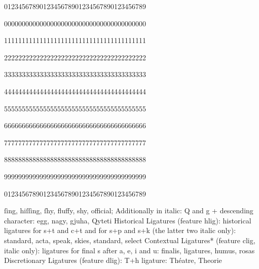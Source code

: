 
\null\par{\mktsTightParagraphs{}\null\par
0123456789012345678901234567890123456789\par
0000000000000000000000000000000000000000\par
1111111111111111111111111111111111111111\par
2222222222222222222222222222222222222222\par
3333333333333333333333333333333333333333\par
4444444444444444444444444444444444444444\par
5555555555555555555555555555555555555555\par
6666666666666666666666666666666666666666\par
7777777777777777777777777777777777777777\par
8888888888888888888888888888888888888888\par
9999999999999999999999999999999999999999\par
0123456789012345678901234567890123456789\par
}

\vspace{\parskip}%
\begin{multicols}{2}\raggedcolumns{}

ſing, hiſſing, ſhy, fluffy, shy, official; Additionally in italic: Q and g + descending character:
egg, nagy, gjuha, Qyteti Historical Ligatures (feature hlig): historical
ligatures for s+t and c+t and for s+p and s+k (the latter two italic only):
standard, acta, speak, skies, standard, select Contextual Ligatures* (feature
clig, italic only): ligatures for final s after a, e, i and u: finalis,
ligatures, humus, rosas Discretionary Ligatures (feature dlig): T+h ligature:
Théatre, Theorie
~\\
~\\
~\\
~\\
~\\
~\\
~\\
~\\
~\\
~\\


\end{multicols}

